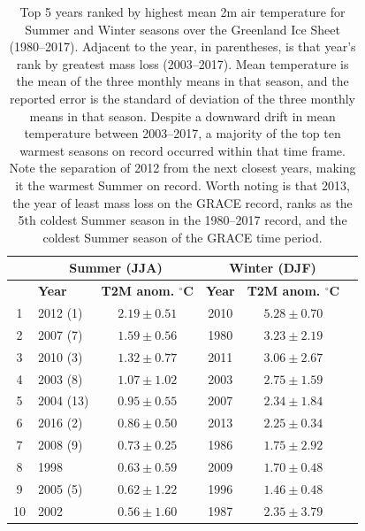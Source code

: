 \documentclass[11pt]{report}
\begin{document}
\begin{table}[!h]
\begin{center}
\begin{tabular}{ |c|l|c||c|c|c| } 
\hline
 & \multicolumn{2}{c}{\bfseries{Summer (JJA)}} & \multicolumn{2}{c|}{\bfseries{Winter (DJF)}} \\
\hline
 & \bfseries{Year} & \bfseries{T2M anom. $^{\circ}$C} & \bfseries{Year} & \bfseries{T2M anom. $^{\circ}$C}\\
\hline
1	& 	2012 (1)	&	$2.19 \pm 0.51$ &	2010	&	$5.28  \pm 0.70$	\\
2	&   2007 (7)	&	$1.59 \pm 0.56$ &	1980	&	$3.23  \pm 2.19$	\\
3	&   2010 (3)	&	$1.32 \pm 0.77$ &	2011	&	$3.06  \pm 2.67$	\\
4	&   2003 (8)	&	$1.07 \pm 1.02$ &	2003	&	$2.75  \pm 1.59$	\\
5	&   2004 (13)	&	$0.95 \pm 0.55$ &	2007	&	$2.34  \pm 1.84$	\\
6	&   2016 (2) 	&	$0.86 \pm 0.50$ &	2013	&	$2.25  \pm 0.34$	\\
7	&   2008 (9)	&	$0.73 \pm 0.25$ &	1986	&	$1.75  \pm 2.92$	\\
8	&   1998 		&	$0.63 \pm 0.59$ &	2009	&	$1.70  \pm 0.48$	\\
9	&   2005 (5)	&	$0.62 \pm 1.22$ &	1996	&	$1.46  \pm 0.48$	\\
10	&   2002		&	$0.56 \pm 1.60$ &	1987	&	$2.35  \pm 3.79$	\\
\hline
\end{tabular}
\caption[Warmest seasons over Greenland Ice Sheet]{Top 5 years ranked by highest mean 2m air temperature for Summer and Winter seasons over the Greenland Ice Sheet (1980--2017). Adjacent to the year, in parentheses, is that year's rank by greatest mass loss (2003--2017). Mean temperature is the mean of the three monthly means in that season, and the reported error is the standard of deviation of the three monthly means in that season. Despite a downward drift in mean temperature between 2003--2017, a majority of the top ten warmest seasons on record occurred within that time frame. Note the separation of 2012 from the next closest years, making it the warmest Summer on record. Worth noting is that 2013, the year of least mass loss on the GRACE record, ranks as the 5th coldest Summer season in the 1980--2017 record, and the coldest Summer season of the GRACE time period. \label{tab:rankedseasons}}
\end{center}
\end{table}
\end{document}
